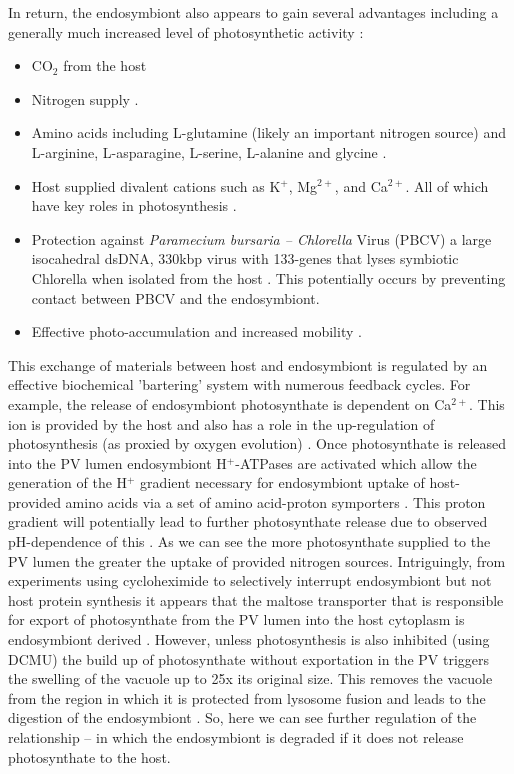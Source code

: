 In return, the endosymbiont also appears to gain several advantages including a generally much increased level of photosynthetic activity \citep{Sommaruga2009}:
\begin{itemize}
    \item CO$_{2}$ from the host \citep{Parker1926}
    \item Nitrogen supply \citep{Johnson2011}.
    \item Amino acids including L-glutamine (likely an important nitrogen source) \citep{Reisser1992} and L-arginine, L-asparagine, L-serine, L-alanine and glycine \citep{Kato2009a}.
    \item Host supplied divalent cations such as K$^{+}$, Mg$^{2+}$, and Ca$^{2+}$. All of which have key roles in photosynthesis \citep{Kato2009a}.
    \item Protection against \textit{Paramecium bursaria – Chlorella} Virus (PBCV) \citep{Yashchenko2012} a large isocahedral dsDNA, 330kbp virus with 133-genes that lyses symbiotic Chlorella when isolated from the host \citep{VanEtten1982}.  This potentially occurs by preventing contact between PBCV and the endosymbiont.
    \item Effective photo-accumulation and increased mobility \citep{Neiss1982}.
\end{itemize}
%
This exchange of materials between host and endosymbiont is regulated by an effective biochemical 'bartering' system with numerous feedback cycles. 
For example, the release of endosymbiont photosynthate is dependent on Ca$^{2+}$.  
This ion is provided by the host and also has a role in the up-regulation of photosynthesis (as proxied by oxygen evolution) \citep{Kato2009a}.     
Once photosynthate is released into the PV lumen endosymbiont H$^{+}$-ATPases are activated which allow the generation of the H$^{+}$ gradient necessary for endosymbiont uptake of host-provided amino acids via a set of amino acid-proton symporters \citep{Camoni2006}.
This proton gradient will potentially lead to further photosynthate release due to observed pH-dependence of this \citep{Kato2009a}. 
As we can see the more photosynthate supplied to the PV lumen the greater the uptake of provided nitrogen sources.  
Intriguingly, from experiments using cycloheximide to selectively interrupt endosymbiont but not host protein synthesis it appears that the maltose transporter that is responsible for export of photosynthate from the PV lumen into the host cytoplasm is endosymbiont derived \citep{Muscatine1967}. 
However, unless photosynthesis is also inhibited (using DCMU) the build up of photosynthate without exportation in the PV triggers the swelling of the vacuole up to 25x its original size.  
This removes the vacuole from the region in which it is protected from lysosome fusion and leads to the digestion of the endosymbiont \citep{Kodama2009}.
So, here we can see further regulation of the relationship – in which the endosymbiont is degraded if it does not release photosynthate to the host.

